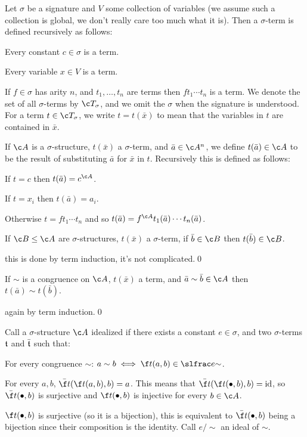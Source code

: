 \bdefn

    Let $\sigma$ be a signature and $V$ some collection of variables (we assume such a collection is global, we don't really care too much what it is).
    Then a {\emphcolor $\sigma$-term} is defined recursively as follows:
    \benum
        \item Every constant $c\in\sigma$ is a term.
        \item Every variable $x\in V$ is a term.
        \item If $f\in\sigma$ has arity $n$, and $t_1,\dots,t_n$ are terms then $ft_1\cdots t_n$ is a term.
    \eenum
    We denote the set of all $\sigma$-terms by $\c T_\sigma$, and we omit the $\sigma$ when the signature is understood.
    For a term $t\in\c T_\sigma$, we write $t=t(\bar x)$ to mean that the variables in $t$ are contained in $\bar x$.

    If $\c A$ is a $\sigma$-structure, $t(\bar x)$ a $\sigma$-term, and $\bar a\in\c A^n$, we define $t(\bar a)\in\c A$ to be the result of substituting $\bar a$ for $\bar x$ in $t$.
    Recursively this is defined as follows:
    \benum
        \item If $t=c$ then $t(\bar a)=c^{\c A}$.
        \item If $t=x_i$ then $t(\bar a)=a_i$.
        \item Otherwise $t=ft_1\cdots t_n$ and so $t(\bar a)=f^{\c A}t_1(\bar a)\cdots t_n(\bar a)$.
    \eenum

\edefn

\blemm

    If $\c B\leq\c A$ are $\sigma$-structures, $t(\bar x)$ a $\sigma$-term, if $\bar b\in\c B$ then $t(\bar b)\in\c B$.

\elemm

\Proof this is done by term induction, it's not complicated.\qed

\blemm

    If $\sim$ is a congruence on $\c A$, $t(\bar x)$ a term, and $\bar a\sim\bar b\in\c A$ then $t(\bar a)\sim t(\bar b)$.

\elemm

\Proof again by term induction.\qed

\bdefn

    Call a $\sigma$-structure $\c A$ {\emphcolor idealized} if there exists a constant $e\in\sigma$, and two $\sigma$-terms ${\frak t}$ and $\bar{\frak t}$ such that:
    \benum
        \item For every congruence $\sim$: $a\sim b \iff \f t(a,b) \in \slfrac e{\sim}$.
        \item For every $a,b$, $\bar{\f t}(\f t(a,b),b)=a$.
            This means that $\bar{\f t}(\f t(\bullet,b),b)={\rm id}$, so $\bar{\f t}(\bullet,b)$ is surjective and $\f t(\bullet,b)$ is injective for every $b\in\c A$.
        \item $\f t(\bullet,b)$ is surjective (so it is a bijection), this is equivalent to $\bar{\f t}(\bullet,b)$ being a bijection since their composition is the identity.
    \eenum
    Call $e/{\sim}$ an {\emphcolor ideal} of $\sim$.

